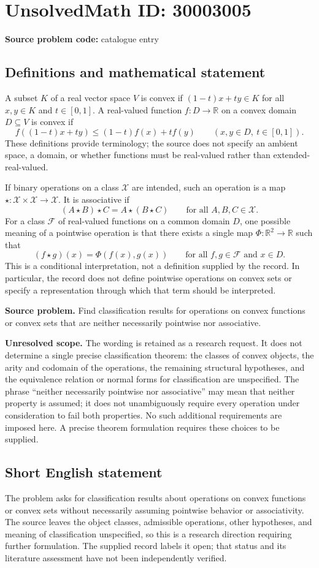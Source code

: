 \documentclass[11pt]{article}
\newcommand{\R}{\mathbb{R}}
\begin{document}
\section*{UnsolvedMath ID: 30003005}
\textbf{Source problem code:} catalogue entry
\subsection{Definitions and mathematical statement}
A subset \(K\) of a real vector space \(V\) is convex if \((1-t)x+ty\in K\) for all \(x,y\in K\) and \(t\in[0,1]\). A real-valued function \(f:D\to\R\) on a convex domain \(D\subseteq V\) is convex if
\[
f((1-t)x+ty)\leq (1-t)f(x)+tf(y)
\qquad(x,y\in D,\ t\in[0,1]).
\]
These definitions provide terminology; the source does not specify an ambient space, a domain, or whether functions must be real-valued rather than extended-real-valued.

If binary operations on a class \(\mathcal X\) are intended, such an operation is a map \(\star:\mathcal X\times\mathcal X\to\mathcal X\). It is associative if
\[
(A\star B)\star C=A\star(B\star C)
\qquad\text{for all }A,B,C\in\mathcal X.
\]
For a class \(\mathcal F\) of real-valued functions on a common domain \(D\), one possible meaning of a pointwise operation is that there exists a single map \(\Phi:\R^2\to\R\) such that
\[
(f\star g)(x)=\Phi(f(x),g(x))
\qquad\text{for all }f,g\in\mathcal F\text{ and }x\in D.
\]
This is a conditional interpretation, not a definition supplied by the record. In particular, the record does not define pointwise operations on convex sets or specify a representation through which that term should be interpreted.

\textbf{Source problem.} Find classification results for operations on convex functions or convex sets that are neither necessarily pointwise nor associative.

\textbf{Unresolved scope.} The wording is retained as a research request. It does not determine a single precise classification theorem: the classes of convex objects, the arity and codomain of the operations, the remaining structural hypotheses, and the equivalence relation or normal forms for classification are unspecified. The phrase ``neither necessarily pointwise nor associative'' may mean that neither property is assumed; it does not unambiguously require every operation under consideration to fail both properties. No such additional requirements are imposed here. A precise theorem formulation requires these choices to be supplied.
\subsection{Short English statement}
The problem asks for classification results about operations on convex functions or convex sets without necessarily assuming pointwise behavior or associativity. The source leaves the object classes, admissible operations, other hypotheses, and meaning of classification unspecified, so this is a research direction requiring further formulation. The supplied record labels it open; that status and its literature assessment have not been independently verified.
\end{document}
